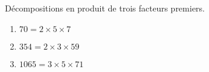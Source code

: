    Décompositions en produit de trois facteurs premiers.

    \begin{enumerate}
        \item $70=2\times 5\times 7$
        \item $354=2\times 3\times 59$
        \item $\num{1065}=3\times 5\times 71$
    \end{enumerate}
